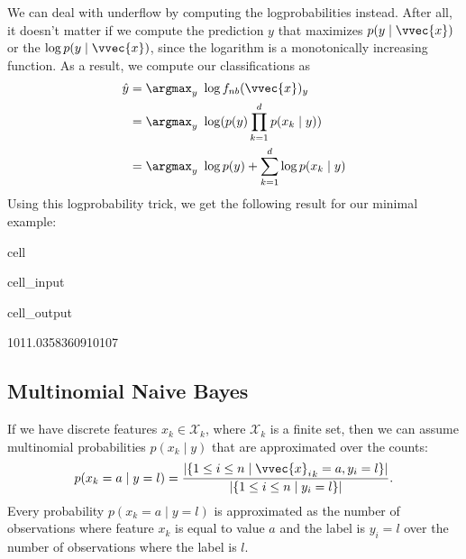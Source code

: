 \documentclass[letterpaper,10pt,english]{jupyterBook}
\begin{document}
\sphinxAtStartPar
We can deal with underflow by computing the log\sphinxhyphen{}probabilities instead. After all, it doesn’t matter if we compute the prediction \(y\) that maximizes \(p(y\mid \vvec{x})\) or the \(\log p(y\mid \vvec{x})\), since the logarithm is a monotonically increasing function. As a result, we compute our classifications as
\begin{align*}
    \hat{y} & = \argmax_y\ \log f_{nb}(\vvec{x})_y\\
&= \argmax_y\ \log(p(y)\prod_{k=1}^d p(x_k\mid y))\\
& = \argmax_y\ \log p(y) + \sum_{k=1}^d \log p(x_k\mid y)
\end{align*}
\sphinxAtStartPar
Using this log\sphinxhyphen{}probability trick, we get the following result for our minimal example:

\begin{sphinxuseclass}{cell}\begin{sphinxVerbatimInput}

\begin{sphinxuseclass}{cell_input}
\begin{sphinxVerbatim}[commandchars=\\\{\}]
\end{sphinxVerbatim}

\end{sphinxuseclass}\end{sphinxVerbatimInput}
\begin{sphinxVerbatimOutput}

\begin{sphinxuseclass}{cell_output}
\begin{sphinxVerbatim}[commandchars=\\\{\}]
\PYGZhy{}1011.0358360910107
\end{sphinxVerbatim}

\end{sphinxuseclass}\end{sphinxVerbatimOutput}

\end{sphinxuseclass}

\subsection{Multinomial Naive Bayes}
\label{\detokenize{classification_naive_bayes:multinomial-naive-bayes}}
\sphinxAtStartPar
If we have discrete features \(x_k\in\mathcal{X}_k\), where \(\mathcal{X}_k\) is a finite set, then we can assume multinomial probabilities \(p(x_k\mid y)\) that are approximated over the counts:
\begin{align*}
p(x_k = a\mid y=l) = \frac{\lvert\{ 1\leq i \leq n\mid {\vvec{x}_i}_k = a, y_i=l \}\rvert}{\lvert\{1\leq i \leq n\mid y_i = l\}\rvert}.
\end{align*}
\sphinxAtStartPar
Every probability \(p(x_k = a\mid y=l)\) is approximated as the number of observations where feature \(x_k\) is equal to value \(a\) and the label is \(y_i=l\) over the number of observations where the label is \(l\).
\end{document}
